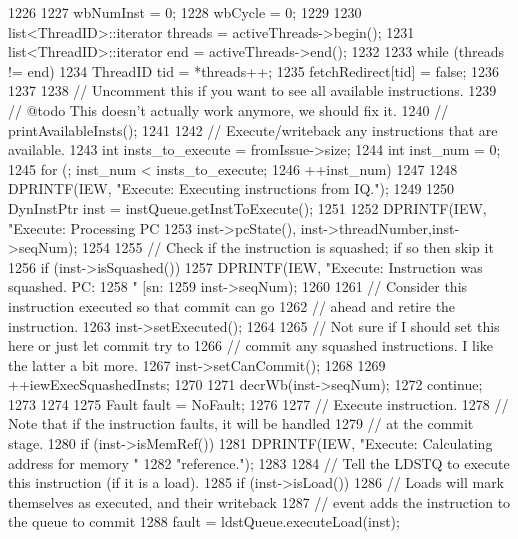 \begin{DoxyCode}
1226 {
1227     wbNumInst = 0;
1228     wbCycle = 0;
1229 
1230     list<ThreadID>::iterator threads = activeThreads->begin();
1231     list<ThreadID>::iterator end = activeThreads->end();
1232 
1233     while (threads != end) {
1234         ThreadID tid = *threads++;
1235         fetchRedirect[tid] = false;
1236     }
1237 
1238     // Uncomment this if you want to see all available instructions.
1239     // @todo This doesn't actually work anymore, we should fix it.
1240 //    printAvailableInsts();
1241 
1242     // Execute/writeback any instructions that are available.
1243     int insts_to_execute = fromIssue->size;
1244     int inst_num = 0;
1245     for (; inst_num < insts_to_execute;
1246           ++inst_num) {
1247 
1248         DPRINTF(IEW, "Execute: Executing instructions from IQ.\n");
1249 
1250         DynInstPtr inst = instQueue.getInstToExecute();
1251 
1252         DPRINTF(IEW, "Execute: Processing PC %
1253                 inst->pcState(), inst->threadNumber,inst->seqNum);
1254 
1255         // Check if the instruction is squashed; if so then skip it
1256         if (inst->isSquashed()) {
1257             DPRINTF(IEW, "Execute: Instruction was squashed. PC: %
1258                          " [sn:%
1259                          inst->seqNum);
1260 
1261             // Consider this instruction executed so that commit can go
1262             // ahead and retire the instruction.
1263             inst->setExecuted();
1264 
1265             // Not sure if I should set this here or just let commit try to
1266             // commit any squashed instructions.  I like the latter a bit more.
1267             inst->setCanCommit();
1268 
1269             ++iewExecSquashedInsts;
1270 
1271             decrWb(inst->seqNum);
1272             continue;
1273         }
1274 
1275         Fault fault = NoFault;
1276 
1277         // Execute instruction.
1278         // Note that if the instruction faults, it will be handled
1279         // at the commit stage.
1280         if (inst->isMemRef()) {
1281             DPRINTF(IEW, "Execute: Calculating address for memory "
1282                     "reference.\n");
1283 
1284             // Tell the LDSTQ to execute this instruction (if it is a load).
1285             if (inst->isLoad()) {
1286                 // Loads will mark themselves as executed, and their writeback
1287                 // event adds the instruction to the queue to commit
1288                 fault = ldstQueue.executeLoad(inst);
}}}}
\end{DoxyCode}
